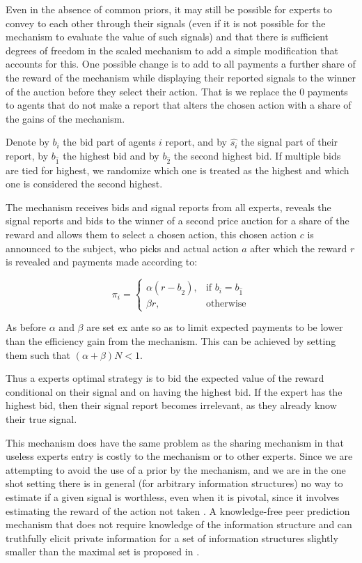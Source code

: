 Even in the absence of common priors, it may still be possible for experts to convey to each other through their signals (even if it is not possible for the mechanism to evaluate the value of such signals) and that there is sufficient degrees of freedom in the scaled mechanism to add a simple modification that accounts for this.
One possible change is to add to all payments a further share of the reward of the mechanism while displaying their reported signals to the winner of the auction before they select their action. That is we replace the 0 payments to agents that do not make a report that alters the chosen action with a  share of the gains of the mechanism.

Denote by $b_i$ the bid part of agents $i$ report, and by $\hat{s_i}$ the signal part of their report, by $b_{\hat{1}}$ the highest bid and by $b_{\hat{2}}$ the second highest bid. If multiple bids are tied for highest, we  randomize which one is treated as the highest and which one is considered the second highest.

\begin{mech}
The mechanism receives bids and signal reports from all experts, reveals the signal reports and bids to the winner of a second price auction for a share of the reward and allows them to select a chosen action, this chosen action $c$ is announced to the subject, who picks and actual action $a$ after which the reward $r$ is revealed and payments made according to:

\[
    \pi_i = 
\begin{cases}
    \alpha (r - b_{\hat{2}} ) ,& \text{if } b_i = b_{\hat{1}}\\
    \beta r,              & \text{otherwise}
\end{cases}
\]

\end{mech}

As before $\alpha$ and $\beta$ are set ex ante so as to limit expected payments to be lower than the efficiency gain from the mechanism. This can be achieved by setting them such that $(\alpha + \beta)N < 1$.


Thus a experts optimal strategy is to bid the expected value of the reward conditional on their signal and on having the highest bid.
If the expert has the highest bid, then their signal report becomes irrelevant, as they already know their true signal. %

This mechanism does have the same problem as the sharing mechanism in that useless experts entry is costly to the mechanism or to other experts.
Since we are attempting to avoid the use of a prior by the mechanism, and we are in the one shot setting there is in general (for arbitrary information structures) no way to estimate if a given signal is worthless, even when it is pivotal, since it involves estimating the reward of the action not taken \cite{della2012crowd,waggoner2014output, witkowski2014robust}.
A knowledge-free peer prediction mechanism that does not require knowledge of the information structure and
can truthfully elicit private information for a set of information structures slightly smaller than the maximal set is proposed in \cite{zhang2014elicitability}. 



